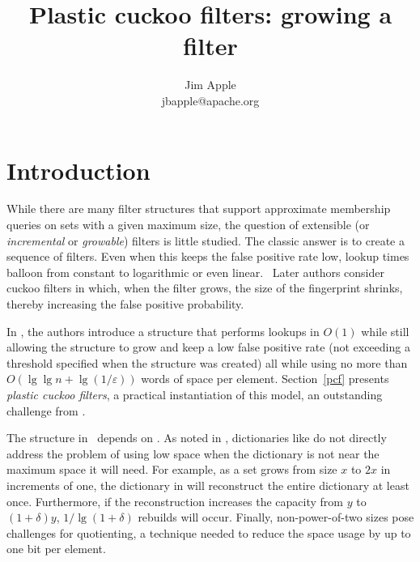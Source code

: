 \documentclass[letterpaper, 11pt]{article}
\begin{document}
\title{Plastic cuckoo filters: growing a filter}
\author{Jim Apple \\
  jbapple@apache.org}

\maketitle


\section{Introduction}
While there are many filter structures that support approximate membership queries on sets with a given maximum size, the question of extensible (or {\em incremental} or {\em growable}) filters is little studied.
The classic answer is to create a sequence of filters.
Even when this keeps the false positive rate low, lookup times balloon from constant to logarithmic or even linear.~\cite{psw,logarithm,consistent-cuckoo} %
Later authors consider cuckoo filters in which, when the filter grows, the size of the fingerprint shrinks, thereby increasing the false positive probability.~\cite{logarithm,morton-journal,vacuum,rsqf}

In \cite{psw}, the authors introduce a structure that performs lookups in $O(1)$ while still allowing the structure to grow and keep a low false positive rate (not exceeding a threshold specified when the structure was created) all while using no more than $O(\lg \lg n + \lg (1/\varepsilon))$ words of space per element.
Section~\ref{pcf} presents {\em plastic cuckoo filters}, a practical instantiation of this model, an outstanding challenge from \cite{psw}.

The structure in~\cite{psw} depends on \cite{succinct}.
As noted in \cite{dysect}, dictionaries like \cite{succinct} do not directly address the problem of using low space when the dictionary is not near the maximum space it will need.
For example, as a set grows from size $x$ to $2x$ in increments of one, the dictionary in \cite{succinct} will reconstruct the entire dictionary at least once.
Furthermore, if the reconstruction increases the capacity from $y$ to $(1 + \delta)y$, $1/\lg(1+\delta)$ rebuilds will occur.
Finally, non-power-of-two sizes pose challenges for quotienting, a technique needed to reduce the space usage by up to one bit per element.~\cite{change-your-base, cleary-quotient}
\end{document}
